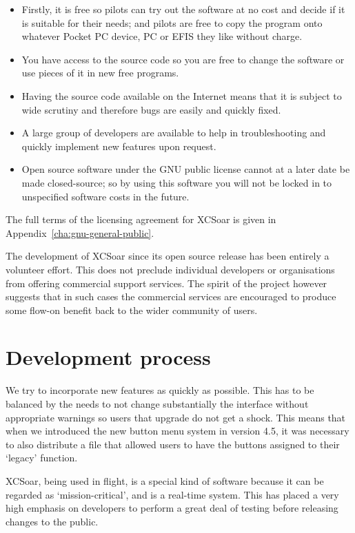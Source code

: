 \documentclass[a4paper,12pt]{refrep}
\begin{document}
\begin{itemize}
\item Firstly, it is free so pilots can try out the software at no
 cost and decide if it is suitable for their needs; and pilots are free
 to copy the program onto whatever Pocket PC device, PC or EFIS they like
 without charge.
\item You have access to the source code so you are free to change
 the software or use pieces of it in new free programs.
\item Having the source code available on the Internet means that it is
 subject to wide scrutiny and therefore bugs are easily and quickly fixed.
\item A large group of developers are available to help in troubleshooting
 and quickly implement new features upon request.
\item Open source software under the GNU public license cannot at a later
 date be made closed-source; so by using this software you will not be
 locked in to unspecified software costs in the future.
\end{itemize}

The full terms of the licensing agreement for XCSoar is given in
Appendix~\ref{cha:gnu-general-public}.

The development of XCSoar since its open source release has been
entirely a volunteer effort.  This does not preclude individual
developers or organisations from offering commercial support services.
The spirit of the project however suggests that in such cases the
commercial services are encouraged to produce some flow-on benefit
back to the wider community of users.

\section{Development process}

We try to incorporate new features as quickly as possible.  This has
to be balanced by the needs to not change substantially the interface
without appropriate warnings so users that upgrade do not get a shock.
This means that when we introduced the new button menu system in
version 4.5, it was necessary to also distribute a file that allowed
users to have the buttons assigned to their `legacy' function.

XCSoar, being used in flight, is a special kind of software because it
can be regarded as `mission-critical', and is a real-time system.
This has placed a very high emphasis on developers to perform a great
deal of testing before releasing changes to the public.  
\end{document}
